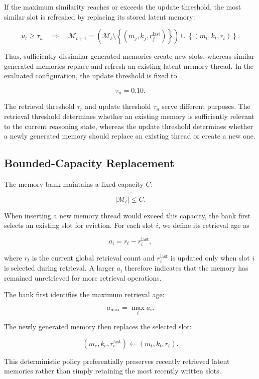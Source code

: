 If the maximum similarity reaches or exceeds the update threshold, the most similar slot is refreshed by replacing its stored latent memory:

\[
u_t\geq\tau_u
\quad\Rightarrow\quad
\mathcal{M}_{t+1} =
\left(
\mathcal{M}_t
\setminus
\left\{
\left(m_j,k_j,r_j^{\mathrm{last}}\right)
\right\}
\right)
\cup
\left\{
\left(m_t,k_t,r_t\right)
\right\}.
\]

Thus, sufficiently dissimilar generated memories create new slots, whereas similar generated memories replace and refresh an existing latent-memory thread. In the evaluated configuration, the update threshold is fixed to

\[
\tau_u=0.10.
\]

The retrieval threshold $\tau_r$ and update threshold $\tau_u$ serve different purposes. The retrieval threshold determines whether an existing memory is sufficiently relevant to the current reasoning state, whereas the update threshold determines whether a newly generated memory should replace an existing thread or create a new one.

\subsection{Bounded-Capacity Replacement}

The memory bank maintains a fixed capacity $C$:

\[
|\mathcal{M}_t| \leq C.
\]

When inserting a new memory thread would exceed this capacity, the bank first selects an existing slot for eviction. For each slot $i$, we define its retrieval age as

\[
a_i = r_t - r_i^{\mathrm{last}},
\]

where $r_t$ is the current global retrieval count and $r_i^{\mathrm{last}}$ is updated only when slot $i$ is selected during retrieval. A larger $a_i$ therefore indicates that the memory has remained unretrieved for more retrieval operations.

The bank first identifies the maximum retrieval age:

\[
a_{\max} = \max_i a_i.
\]

The newly generated memory then replaces the selected slot:

\[
(m_e,k_e,r_e^{\mathrm{last}})
\leftarrow
(m_t,k_t,r_t).
\]

This deterministic policy preferentially preserves recently retrieved latent memories rather than simply retaining the most recently written slots.

